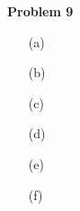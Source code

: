 \documentclass[11pt]{article}
\begin{document}
    \begin{center}
        \Large
        \textbf{Problem 9}
    \end{center}
    \normalsize
    \begin{enumerate}
        \item[(a)] %
        \item[(b)] %
        \item[(c)] %
        \item[(d)] %
        \item[(e)] %
        \item[(f)] %
    \end{enumerate}
\end{document}
